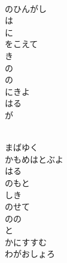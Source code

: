 \documentclass[10pt,b5j]{tarticle} %
\begin{document}
\vspace{1.5em} %
\newcommand{\linespace}{0.5em} %
\newcommand{\blocksize}{0.5\hsize} %
\newcommand{\itemmargin}{3em} %
\begin{enumerate} %
    \setlength{\itemindent}{\itemmargin} %
    \begin{minipage}[c]{\blocksize}
    
        \vspace{\linespace}
        \item~\\
        のひんがし\\
        は\\
        に\\
        をこえて\\
        き\\
        の\\
        の\\
        にきよ\\
        はる\\
        が
        
    \end{minipage}
    \begin{minipage}[c]{\blocksize}
        
        \vspace{\linespace}
        \item~\\
        まばゆく\\
        かもめはとぶよ\\
        はる\\
        のもと\\
        しき\\
        のせて\\
        のの\\
        と\\
        かにすすむ\\
        わがおしょろ
        
    \end{minipage}
    \begin{minipage}[c]{\blocksize}
        

\end{minipage}
\end{enumerate}
\end{document}
